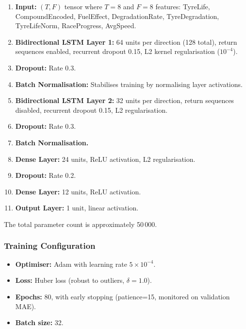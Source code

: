 \documentclass[journal,twoside]{IEEEtran}
\begin{document}
\begin{enumerate}[noitemsep]
  \item \textbf{Input:} $(T, F)$ tensor where $T=8$ and $F=8$
  features: TyreLife, CompoundEncoded, FuelEffect, DegradationRate,
  TyreDegradation, TyreLifeNorm, RaceProgress, AvgSpeed.

  \item \textbf{Bidirectional LSTM Layer 1:} 64 units per direction
  (128 total), return sequences enabled, recurrent dropout 0.15, L2
  kernel regularisation ($10^{-4}$).

  \item \textbf{Dropout:} Rate 0.3.

  \item \textbf{Batch Normalisation:} Stabilises training by
  normalising layer activations.

  \item \textbf{Bidirectional LSTM Layer 2:} 32 units per direction,
  return sequences disabled, recurrent dropout 0.15, L2 regularisation.

  \item \textbf{Dropout:} Rate 0.3.

  \item \textbf{Batch Normalisation.}

  \item \textbf{Dense Layer:} 24 units, ReLU activation, L2
  regularisation.

  \item \textbf{Dropout:} Rate 0.2.

  \item \textbf{Dense Layer:} 12 units, ReLU activation.

  \item \textbf{Output Layer:} 1 unit, linear activation.
\end{enumerate}

The total parameter count is approximately 50\,000.

\subsubsection{Training Configuration}

\begin{itemize}[noitemsep]
  \item \textbf{Optimiser:} Adam with learning rate $5 \times 10^{-4}$.
  \item \textbf{Loss:} Huber loss (robust to outliers, $\delta=1.0$).
  \item \textbf{Epochs:} 80, with early stopping (patience=15,
  monitored on validation MAE).
  \item \textbf{Batch size:} 32.
\end{itemize}
\end{document}
